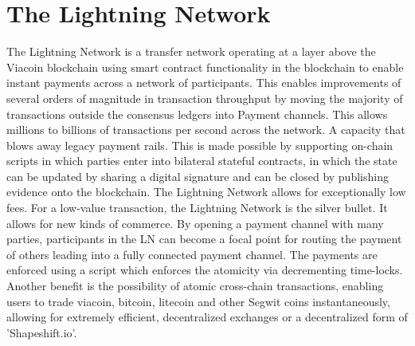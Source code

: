 \documentclass{article}
\begin{document}
\section{The Lightning Network}\label{sec: The Lightning Network}
\cite{lightningNetwork}The Lightning Network is a transfer network operating at a layer above the
Viacoin blockchain using smart contract functionality in the blockchain to enable instant payments across a network of participants. 
This enables improvements of several orders of magnitude in
transaction throughput by moving the majority of transactions outside the
consensus ledgers into Payment channels. This allows millions to billions of transactions per second across the network.
A capacity that blows away legacy payment rails.
This is made possible by supporting on-chain scripts in which parties enter into bilateral stateful contracts, in which the state
can be updated by sharing a digital signature and can be closed by publishing
evidence onto the blockchain.
\newline \newline \noindent
The Lightning Network allows for exceptionally low fees. For a low-value transaction, the Lightning Network
is the silver bullet. It allows for new kinds of commerce.
By opening a payment channel with many parties, participants in the LN can
become a focal point for routing the payment of others leading into a fully
connected payment channel. The payments are enforced using a script which enforces the atomicity via decrementing time-locks.
\newline \newline \noindent
Another benefit is the possibility of atomic cross-chain transactions, enabling users to trade viacoin, bitcoin, litecoin and other Segwit coins
instantaneously, allowing for extremely efficient, decentralized exchanges or a decentralized form of 'Shapeshift.io'.
\newpage
\end{document}
